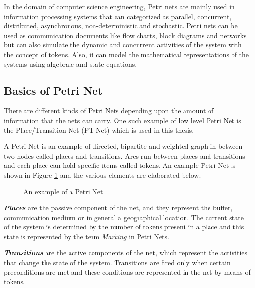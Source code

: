 In the domain of computer science engineering, Petri nets are mainly used in information processing systems that can categorized as parallel, concurrent, distributed, asynchronous, non-deterministic and stochastic. Petri nets can be used as communication documents like flow charts, block diagrams and networks but can also simulate the dynamic and concurrent activities of the system with the concept of tokens. Also, it can model the mathematical representations of the systems using algebraic and state equations. 

\subsection{Basics of Petri Net}
There are different kinds of Petri Nets depending upon the amount of information that the nets can carry. One such example of low level Petri Net is the Place/Transition Net (PT-Net) which is used in this thesis.

A Petri Net is an example of directed, bipartite and weighted graph in between two nodes called places and transitions. Arcs run between places and transitions and each place can hold specific items called tokens. An example Petri Net is shown in Figure \ref{fig:petrinet_example} and the various elements are elaborated below.

\begin{figure}[htb!]
\centering
{}
\caption{An example of a Petri Net}
\label{fig:petrinet_example}
\end{figure}

\textbf{\textit{Places}} are the passive component of the net, and they represent the buffer, communication medium or in general a geographical location. The current state of the system is determined by the number of tokens present in a place and this state is represented by the term \textit{Marking} in Petri Nets.

\textbf{\textit{Transitions}} are the active components of the net, which represent the activities that change the state of the system. Transitions are fired only when certain preconditions are met and these conditions are represented in the net by means of tokens.

